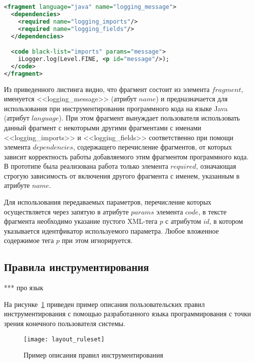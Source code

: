 \begin{lstlisting}[frame=single, language=XML, label={fragment-example}, caption={Пример пользовательского фрагмента}]
<fragment language="java" name="logging_message">
  <dependencies>
    <required name="logging_imports"/>
    <required name="logging_fields"/>
  </dependencies>

  <code black-list="imports" params="message">
    iLogger.log(Level.FINE, <p id="message"/>);
  </code>
</fragment>
\end{lstlisting}

Из приведенного листинга видно, что фрагмент состоит из элемента $fragment$, именуется <<logging\_message>> (атрибут $name$) и предназначается для использования при инструментировании программного кода на языке Java (атрибут $language$).
При этом фрагмент вынуждает пользователя использовать данный фрагмент с некоторыми другими фрагментами с именами <<logging\_imports>> и <<logging\_fields>> соответственно при помощи элемента $dependencies$, содержащего перечисление фрагментов, от которых зависит корректность работы добавляемого этим фрагментом программного кода.
В прототипе была реализована работа только элемента $required$, означающая строгую зависимость от включения другого фрагмента с именем, указанным в атрибуте $name$.

Для использования передаваемых параметров, перечисление которых осуществляется через запятую в атрибуте $params$ элемента $code$, в тексте фрагмента необходимо указание пустого XML-тега $p$ с атрибутом $id$, в котором указывается идентфикатор используемого параметра.
Любое вложенное содержимое тега $p$ при этом игнорируется.

\subsection{Правила инструментирования}

***
про язык

На рисунке~\ref{fig:layout-ruleset} приведен пример описания пользовательских правил инструментирования с помощью разработанного языка программирования с точки зрения конечного пользователя системы.

\begin{figure}[!h]
	\centering
	\texttt{[image: layout\_ruleset]}
	\caption{Пример описания правил инструментирования}
	\label{fig:layout-ruleset}
\end{figure}

